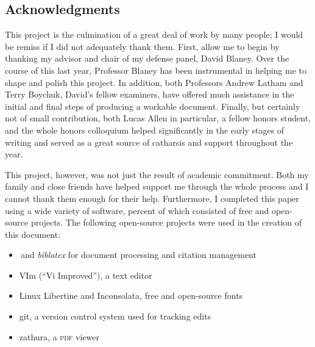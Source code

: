 \documentclass[openany,twoside]{memoir}
\begin{document}
\begin{Spacing}{2}
\chapter{Acknowledgments}
\thispagestyle{fancy}
This project is the culmination of a great deal of work by many people; I would be remiss if I did not adequately thank them.
First, allow me to begin by thanking my advisor and chair of my defense panel, David Blaney.
Over the course of this last year, Professor Blaney has been instrumental in helping me to shape and polish this project.
In addition, both Professors Andrew Latham and Terry Boychuk, David's fellow examiners, have offered much assistance in the initial and final steps of producing a workable document.
Finally, but certainly not of small contribution, both Lucas Allen in particular, a fellow honors student, and the whole honors colloquium helped significantly in the early stages of writing and served as a great source of catharsis and support throughout the year.

This project, however, was not just the result of academic commitment.
Both my family and close friends have helped support me through the whole process and I cannot thank them enough for their help.
Furthermore, I completed this paper using a wide variety of software,  percent of which consisted of free and open-source projects.
The following open-source projects were used in the creation of this document:

\end{Spacing}\begin{itemize}
   \item{\XeLaTeX\,and \emph{biblatex} for document processing and citation management}
   \item{VIm (``Vi Improved''), a text editor}
   \item{Linux Libertine and Inconsolata, free and open-source fonts}
   \item{git, a version control system used for tracking edits}
   \item{zathura, a \textsc{pdf} viewer}
\end{itemize}
\end{document}

